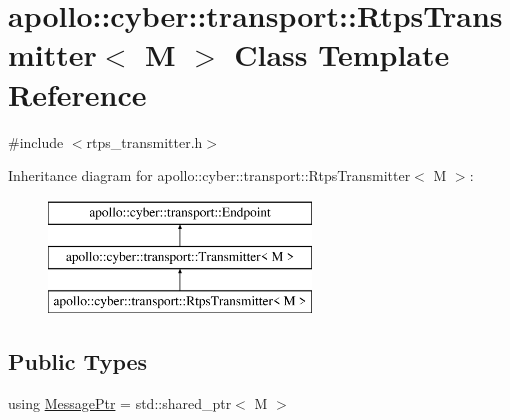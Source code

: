 \hypertarget{classapollo_1_1cyber_1_1transport_1_1RtpsTransmitter}{\section{apollo\-:\-:cyber\-:\-:transport\-:\-:Rtps\-Transmitter$<$ M $>$ Class Template Reference}
\label{classapollo_1_1cyber_1_1transport_1_1RtpsTransmitter}
}


{\ttfamily \#include $<$rtps\-\_\-transmitter.\-h$>$}

Inheritance diagram for apollo\-:\-:cyber\-:\-:transport\-:\-:Rtps\-Transmitter$<$ M $>$\-:\begin{figure}[H]
\begin{center}
\leavevmode
\includegraphics[height=3.000000cm]{classapollo_1_1cyber_1_1transport_1_1RtpsTransmitter}
\end{center}
\end{figure}
\subsection*{Public Types}
\begin{DoxyCompactItemize}
\item 
using \hyperlink{classapollo_1_1cyber_1_1transport_1_1RtpsTransmitter_a28d14859d872c87fc358036e87487663}{Message\-Ptr} = std\-::shared\-\_\-ptr$<$ M $>$
\end{DoxyCompactItemize}
